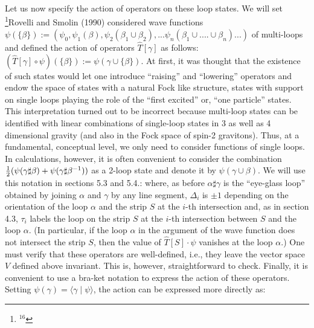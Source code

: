 Let us now specify the action of operators on these loop states. We will
set
\footnote{$^{16}$}{Rovelli and Smolin (1990) considered wave functions
$\psi(\{\beta\}) := (\psi_0 , \psi_1(\beta), \psi_2(\beta_1\cup\beta_2),
...\psi_n(\beta_1\cup ....\cup\beta_n ) ... )$ of multi-loops and defined
the action of operators $\hat{T}[\gamma]$ as follows: $(\hat{T}[\gamma ]
\circ\psi) (\{\beta\}) := \psi (\gamma\cup\{\beta\})$. At first, it was
thought that the existence of such states would let one introduce
``raising'' and ``lowering'' operators and
endow the space of states with a natural Fock like structure, states with
support on single loops playing the role of the ``first excited'' or,
``one particle'' states. This interpretation turned out to be incorrect
because multi-loop states can be identified with linear combinations of
single-loop states in 3 as well as 4 dimensional gravity (and also in the
Fock space of spin-2 gravitons). Thus, at a fundamental, conceptual level,
we only need to consider functions of single loops. In calculations, however,
it is often convenient to consider the combination $\textstyle{1\over 2}(\psi
(\gamma\sharp\beta)+ \psi (\gamma\sharp\beta^{-1}))$ as a 2-loop state and
denote it by $\psi (\gamma\cup\beta )$. We will use this notation in sections
5.3 and 5.4.}:
where, as before $\alpha\sharp\gamma$ is the ``eye-glass loop'' obtained
by joining $\alpha$ and $\gamma$ by any line segment,
$\Delta_i$ is $\pm 1$ depending on the orientation of the loop
$\alpha$ and the strip $S$ at the $i$-th intersection and, as in section
4.3, $\tau_i$ labels the loop on the strip $S$ at the $i$-th intersection
between $S$ and the loop $\alpha$. (In particular, if the loop $\alpha$
in the argument of the wave function does not intersect the strip $S$,
then the value of $\hat{T}[S]\cdot \psi$ vanishes at the loop $\alpha$.)
One must verify that these operators are well-defined, i.e., they leave
the vector space $V$ defined above invariant. This is, however,
straightforward to check. Finally, it is convenient to use a bra-ket notation
to express the action of these operators. Setting $\psi(\gamma ) =\langle
\gamma\mid \psi \rangle$, the action can be expressed more directly as:
